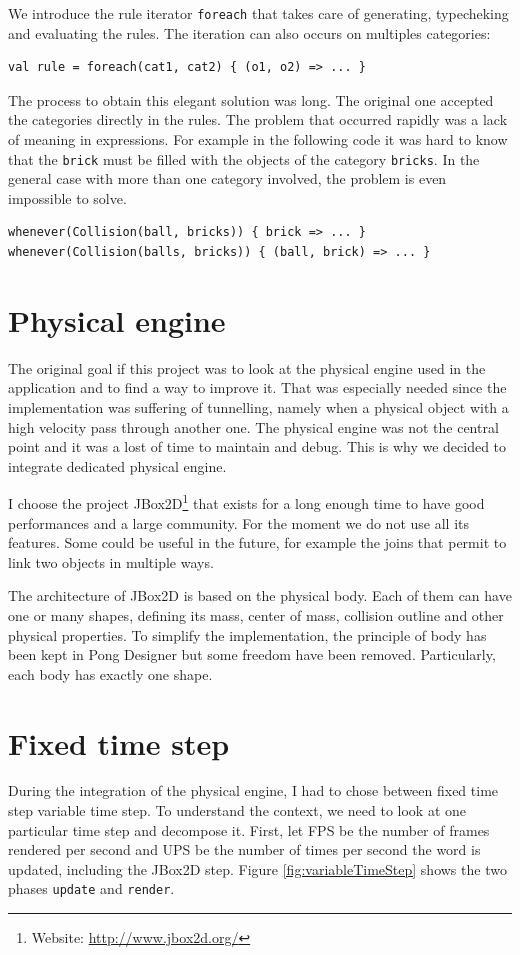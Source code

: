 \documentclass[11pt,a4paper]{article}
\begin{document}
We introduce the rule iterator \texttt{foreach} that takes care of generating, typecheking and evaluating the rules. The iteration can also occurs on multiples categories:

\begin{lstlisting}
val rule = foreach(cat1, cat2) { (o1, o2) => ... }
\end{lstlisting}

The process to obtain this elegant solution was long. The original one accepted the categories directly in the rules. The problem that occurred rapidly was a lack of meaning in expressions. For example in the following code it was hard to know that the \texttt{brick} must be filled with the objects of the category \texttt{bricks}. In the general case with more than one category involved, the problem is even impossible to solve. 
\begin{lstlisting}
whenever(Collision(ball, bricks)) { brick => ... }
whenever(Collision(balls, bricks)) { (ball, brick) => ... }
\end{lstlisting}

\section{Physical engine}
The original goal if this project was to look at the physical engine used in the application and to find a way to improve it. That was especially needed since the implementation was suffering of tunnelling, namely when a physical object with a high velocity pass through another one. The physical engine was not the central point and it was a lost of time to maintain and debug. This is why we decided to integrate dedicated physical engine. 

I choose the project JBox2D\footnote{Website: \url{http://www.jbox2d.org/}} that exists for a long enough time to have good performances and a large community. For the moment we do not use all its features. Some could be useful in the future, for example the joins that permit to link two objects in multiple ways.

The architecture of JBox2D is based on the physical body. Each of them can have one or many shapes, defining its mass, center of mass, collision outline and other physical properties. To simplify the implementation, the principle of body has been kept in Pong Designer but some freedom have been removed. Particularly, each body has exactly one shape.

\section{Fixed time step}
During the integration of the physical engine, I had to chose between fixed time step variable time step. To understand the context, we need to look at one particular time step and decompose it. First, let FPS be the number of frames rendered per second and UPS be the number of times per second the word is updated, including the JBox2D step. Figure \ref{fig:variableTimeStep} shows the two phases \texttt{update} and \texttt{render}. 
\end{document}
